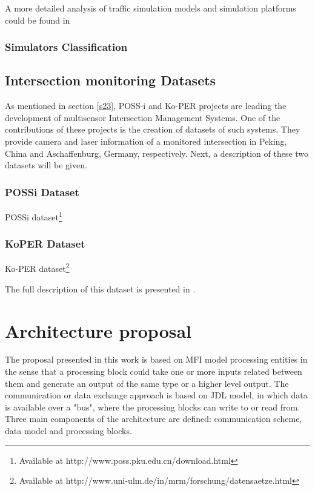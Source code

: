A more detailed analysis of traffic simulation models and simulation platforms could be found in \cite{AdamsBoxill2000, Barcelo2000, Kitamura2005, Lieberman1992}
\subsubsection{Simulators Classification}
\subsection{Intersection monitoring Datasets}

As mentioned in section \ref{s23}, POSS-i and Ko-PER projects are leading the development of multisensor Intersection Management Systems. One of the contributions of these projects is the creation of datasets of such systems. They provide camera and laser information of a monitored intersection in Peking, China and Aschaffenburg, Germany, respectively. Next, a description of these two datasets will be given.

\subsubsection{POSSi Dataset }

POSSi dataset\footnote{Available at http://www.poss.pku.edu.cn/download.html}
\subsubsection{KoPER Dataset }

Ko-PER dataset\footnote{Available at http://www.uni-ulm.de/in/mrm/forschung/datensaetze.html}

The full description of this dataset is presented in \cite{Strigel2014}.

\section{Architecture proposal}

The proposal presented in this work is based on MFI model processing entities in the sense that a processing block could take one or more inputs related between them and generate an output of the same type or a higher level output. The communication or data exchange approach is based on JDL model, in which data is available over a "bus", where the processing blocks can write to or read from. Three main components of the architecture are defined: communication scheme, data model and  processing blocks. 



